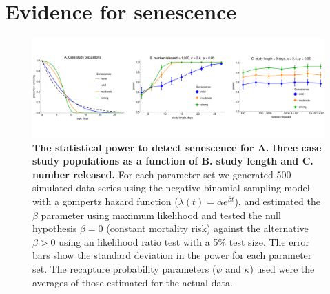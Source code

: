 \documentclass[12pt]{article}
\begin{document}
\section{Evidence for senescence}


\begin{figure}[ht]
	\centerline{\includegraphics[width=1.25\textwidth]{./Figure_files/mrr_mcPowerAnalysis_senescence.pdf}}
	\caption{\textbf{The statistical power to detect senescence for A. three case study populations as a function of B. study length and C. number released.} For each parameter set we generated 500 simulated data series using the negative binomial sampling model with a gompertz hazard function ($\lambda(t) = \alpha e^{\beta t}$), and estimated the $\beta$ parameter using maximum likelihood and tested the null hypothesis $\beta=0$ (constant mortality risk) against the alternative $\beta>0$ using an likelihood ratio test with a 5\% test size. The error bars show the standard deviation in the power for each parameter set. The recapture probability parameters ($\psi$ and $\kappa$) used were the averages of those estimated for the actual data.}
	\label{fig:mrr_mcPowerAnalysis_senescence}
\end{figure}
\end{document}
